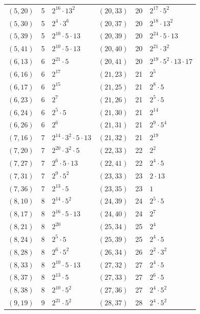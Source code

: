 \documentclass[11pt]{article}
\begin{document}
\begin{longtable}{@{}lrl@{\qquad}lrl@{}}
$(5,20)$ & 5 & $2^{16}\cdot 13^{2}$ & $(20,33)$ & 20 & $2^{17}\cdot 5^{2}$\\
$(5,30)$ & 5 & $2^{4}\cdot 3^{6}$ & $(20,37)$ & 20 & $2^{18}\cdot 13^{2}$\\
$(5,39)$ & 5 & $2^{10}\cdot 5\cdot 13$ & $(20,39)$ & 20 & $2^{24}\cdot 5\cdot 13$\\
$(5,41)$ & 5 & $2^{10}\cdot 5\cdot 13$ & $(20,40)$ & 20 & $2^{21}\cdot 3^{2}$\\
$(6,13)$ & 6 & $2^{21}\cdot 5$ & $(20,41)$ & 20 & $2^{19}\cdot 5^{2}\cdot 13\cdot 17$\\
$(6,16)$ & 6 & $2^{17}$ & $(21,23)$ & 21 & $2^{5}$\\
$(6,17)$ & 6 & $2^{15}$ & $(21,25)$ & 21 & $2^{8}\cdot 5$\\
$(6,23)$ & 6 & $2^{7}$ & $(21,26)$ & 21 & $2^{5}\cdot 5$\\
$(6,24)$ & 6 & $2^{5}\cdot 5$ & $(21,30)$ & 21 & $2^{14}$\\
$(6,26)$ & 6 & $2^{6}$ & $(21,31)$ & 21 & $2^{9}\cdot 5^{4}$\\
$(7,16)$ & 7 & $2^{14}\cdot 3^{2}\cdot 5\cdot 13$ & $(21,32)$ & 21 & $2^{19}$\\
$(7,20)$ & 7 & $2^{20}\cdot 3^{2}\cdot 5$ & $(22,33)$ & 22 & $2^{2}$\\
$(7,27)$ & 7 & $2^{6}\cdot 5\cdot 13$ & $(22,41)$ & 22 & $2^{4}\cdot 5$\\
$(7,31)$ & 7 & $2^{9}\cdot 5^{2}$ & $(23,33)$ & 23 & $2\cdot 13$\\
$(7,36)$ & 7 & $2^{13}\cdot 5$ & $(23,35)$ & 23 & $1$\\
$(8,10)$ & 8 & $2^{14}\cdot 5^{2}$ & $(24,39)$ & 24 & $2^{5}\cdot 5$\\
$(8,17)$ & 8 & $2^{16}\cdot 5\cdot 13$ & $(24,40)$ & 24 & $2^{7}$\\
$(8,21)$ & 8 & $2^{20}$ & $(25,34)$ & 25 & $2^{4}$\\
$(8,24)$ & 8 & $2^{5}\cdot 5$ & $(25,39)$ & 25 & $2^{4}\cdot 5$\\
$(8,28)$ & 8 & $2^{6}\cdot 5^{2}$ & $(26,34)$ & 26 & $2^{2}\cdot 3^{2}$\\
$(8,33)$ & 8 & $2^{10}\cdot 5\cdot 13$ & $(27,32)$ & 27 & $2^{4}\cdot 5$\\
$(8,37)$ & 8 & $2^{13}\cdot 5$ & $(27,33)$ & 27 & $2^{6}\cdot 5$\\
$(8,38)$ & 8 & $2^{10}\cdot 5^{2}$ & $(27,36)$ & 27 & $2^{4}\cdot 5^{2}$\\
$(9,19)$ & 9 & $2^{21}\cdot 5^{2}$ & $(28,37)$ & 28 & $2^{4}\cdot 5^{2}$\\

\end{longtable}
\end{document}
